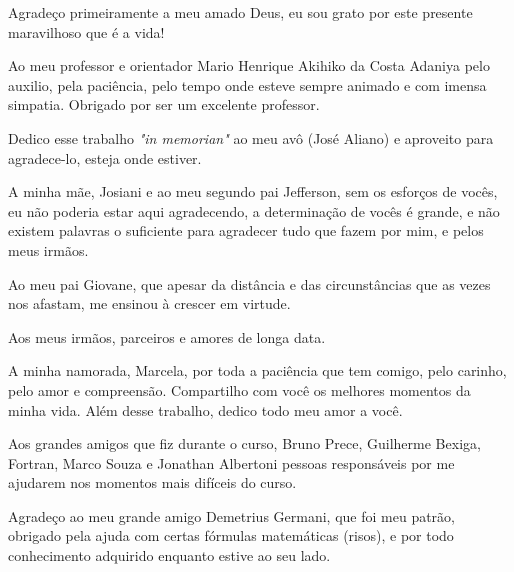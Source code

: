 \begin{agradecimentos}
Agradeço primeiramente a meu amado Deus, eu sou grato por este presente maravilhoso que é a vida!

Ao meu professor e orientador Mario Henrique Akihiko da Costa Adaniya pelo auxilio, pela paciência, pelo tempo onde esteve sempre animado e com imensa simpatia. Obrigado por ser um excelente professor.

Dedico esse trabalho \textit{"in memorian"} ao meu avô (José Aliano) e aproveito para agradece-lo, esteja onde estiver.

A minha mãe, Josiani e ao meu segundo pai Jefferson, sem os esforços de vocês, eu não poderia estar aqui agradecendo, a determinação de vocês é grande, e não existem palavras o suficiente para agradecer tudo que fazem por mim, e pelos meus irmãos.

Ao meu pai Giovane, que apesar da distância e das circunstâncias que as vezes nos afastam, me ensinou à crescer em virtude.
  
Aos meus irmãos, parceiros e amores de longa data.

A minha namorada, Marcela, por toda a paciência que tem comigo, pelo carinho, pelo amor e compreensão. Compartilho com você os melhores momentos da minha vida. Além desse trabalho, dedico todo meu amor a você.

Aos grandes amigos que fiz durante o curso, Bruno Prece, Guilherme Bexiga, Fortran, Marco Souza e Jonathan Albertoni pessoas responsáveis por me ajudarem nos momentos mais difíceis do curso.

Agradeço ao meu grande amigo Demetrius Germani, que foi meu patrão, obrigado pela ajuda com certas fórmulas matemáticas (risos), e por todo conhecimento adquirido enquanto estive ao seu lado.

\end{agradecimentos}
